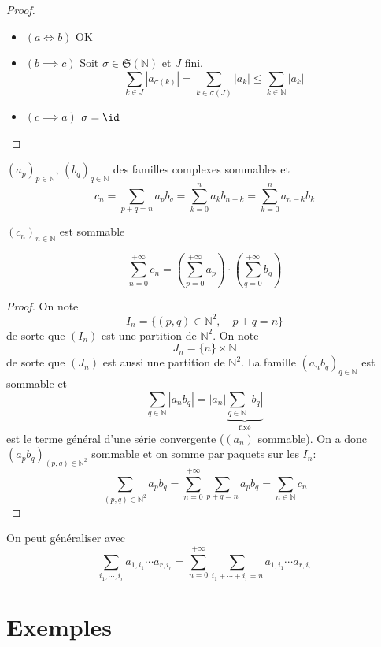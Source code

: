 \begin{proof}~
    \begin{itemize}
        \item $(a\iff b)$ OK
        \item $(b\implies c)$ Soit $\sigma\in\mathfrak S(\mathbb N)$ et $J$ fini. \[
                \sum_{k\in J}|a_{\sigma(k)}|=\sum_{k\in\sigma(J)}|a_k|\leq \sum_{k\in\mathbb N}|a_k|
            \]
        \item $(c\implies a)$ $\sigma=\id$
    \end{itemize}
\end{proof}

\begin{thm}
    \Hyp $(a_p)_{p\in\mathbb N}$, $(b_q)_{q\in\mathbb N}$ des familles complexes sommables et \[
        c_n=\sum_{p+q=n}a_pb_q=\sum_{k=0}^na_kb_{n-k}=\sum_{k=0}^na_{n-k}b_k
    \]
    \begin{concenum}
    \item $(c_n)_{n\in\mathbb N}$ est sommable
    \item \[
            \sum_{n=0}^{+\infty}c_n= \left( \sum_{p=0}^{+\infty} a_p \right)\cdot \left( \sum_{q=0}^{+\infty}b_q \right)
        \]
    \end{concenum}
\end{thm}

\begin{proof}
    On note \[
        I_n=\{(p, q)\in\mathbb N^2, \quad p+q=n\}
    \]
    de sorte que $(I_n)$ est une partition de $\mathbb N^2$. On note \[
        J_n=\{n\}\times \mathbb N
    \]
    de sorte que $(J_n)$ est aussi une partition de $\mathbb N^2$. La famille $(a_nb_q)_{q\in\mathbb N}$ est sommable et \[
        \sum_{q\in\mathbb N}|a_nb_q|=|a_n|\underbrace{\sum_{q\in\mathbb N}|b_q|}_{\text{fixé}}
    \]
    est le terme général d'une série convergente ($(a_n)$ sommable).
    On a donc $(a_pb_q)_{(p, q)\in\mathbb N^2}$ sommable et on somme par paquets sur les $I_n$:\[
        \sum_{(p, q)\in\mathbb N^2}a_pb_q=\sum_{n=0}^{+\infty}\sum_{p+q=n}a_pb_q=\sum_{n\in\mathbb N}c_n
    \]
\end{proof}

\begin{rem}
    On peut généraliser avec \[
        \sum_{i_1, \cdots, i_r}a_{1,i_1}\cdots a_{r,i_r}=\sum_{n=0}^{+\infty}\sum_{i_1+\cdots+i_r=n}a_{1,i_1}\cdots a_{r, i_r}
    \]
\end{rem}

\section{Exemples}

